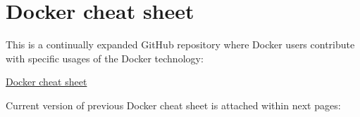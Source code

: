 \chapter{Docker cheat sheet}\label{ANX:csd}

This is a continually expanded GitHub repository where Docker users contribute with specific usages of the Docker technology:

\href{https://github.com/wsargent/docker-cheat-sheet}{Docker cheat sheet}

Current version of previous Docker cheat sheet is attached within next pages:


